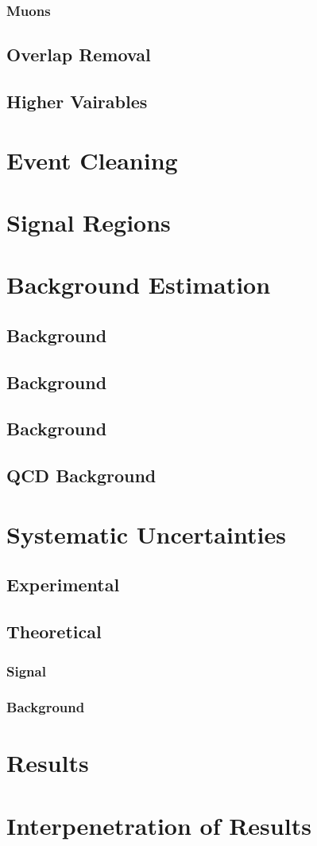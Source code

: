 \subsubsection{Muons}
\subsection{Overlap Removal}
\subsection{Higher Vairables}
\subsubsection{\met}

\section{Event Cleaning}

\section{Signal Regions}

\section{Background Estimation}
\subsection{\wjets Background}
\subsection{\zjets Background}
\subsection{\topbg Background}
\subsection{QCD Background}

\section{Systematic Uncertainties}
\subsection{Experimental}
\subsection{Theoretical}
\subsubsection{Signal}
\subsubsection{Background}

\section{Results}
\section{Interpenetration of Results}
